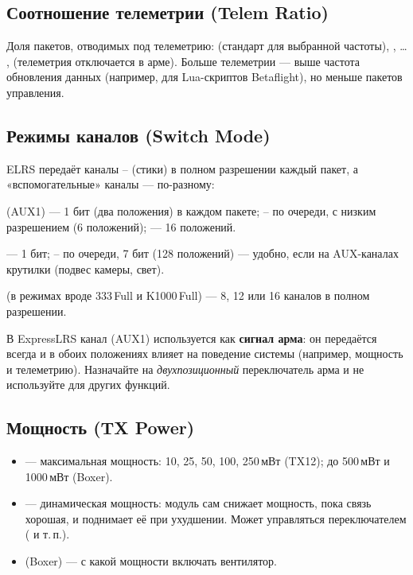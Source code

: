 \subsection{Соотношение телеметрии (Telem Ratio)}

Доля пакетов, отводимых под телеметрию:  (стандарт для выбранной частоты),
,  … ,  (телеметрия отключается в арме).
Больше телеметрии --- выше частота обновления данных (например, для Lua-скриптов
Betaflight), но меньше пакетов управления.

\subsection{Режимы каналов (Switch Mode)}

ELRS передаёт каналы -- (стики) в полном разрешении каждый пакет, а
«вспомогательные» каналы --- по-разному:

\begin{description}[font=\sffamily\bfseries\color{etx}]
  \item[Hybrid]  (AUX1) --- 1 бит (два положения) в каждом пакете; --
        по очереди, с низким разрешением (6 положений);  --- 16 положений.
  \item[Wide]  --- 1 бит; -- по очереди, 7 бит (128 положений) ---
        удобно, если на AUX-каналах крутилки (подвес камеры, свет).
  \item[Full Res] (в режимах вроде 333\,Full и K1000\,Full) --- 8, 12 или 16 каналов
        в полном разрешении.
\end{description}

\begin{caution}
В ExpressLRS канал  (AUX1) используется как \textbf{сигнал арма}: он передаётся
всегда и в обоих положениях влияет на поведение системы (например, мощность и телеметрию).
Назначайте на  \emph{двухпозиционный} переключатель арма и не используйте 
для других функций.
\end{caution}

\subsection{Мощность (TX Power)}

\begin{itemize}
  \item {} --- максимальная мощность: 10, 25, 50, 100, 250\,мВт (TX12);
        до 500\,мВт и 1000\,мВт (Boxer).
  \item {} --- динамическая мощность: модуль сам снижает мощность, пока связь
        хорошая, и поднимает её при ухудшении. Может управляться переключателем (
        и т.\,п.).
  \item {} (Boxer) --- с какой мощности включать вентилятор.
\end{itemize}

